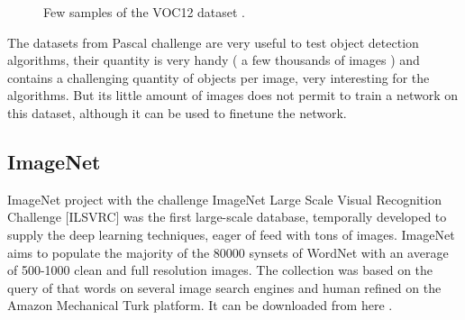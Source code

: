 \begin{figure}[H]
		
\centering
{}
\caption{Few samples of the VOC12 dataset .} \label{voc12data}

\end{figure}


The datasets from Pascal challenge are very useful to test object detection algorithms, their quantity is very handy ( a few thousands of images ) and contains a challenging quantity of objects per image, very interesting for the algorithms. But its little amount of images does not permit to train a network on this dataset, although it can be used to finetune the network.


\subsection{ImageNet}



ImageNet project \cite{imagenet} with the challenge ImageNet Large Scale Visual Recognition Challenge [ILSVRC] was the first large-scale database, temporally developed to supply the deep learning techniques, eager of feed with tons of images. ImageNet aims to populate the majority of the 80000 synsets of WordNet with an average of 500-1000 clean and full resolution images. The collection was based on the query of that words on several image search engines and human refined on the Amazon Mechanical Turk platform. It can be downloaded from here \cite{imagenetWebsite}.

